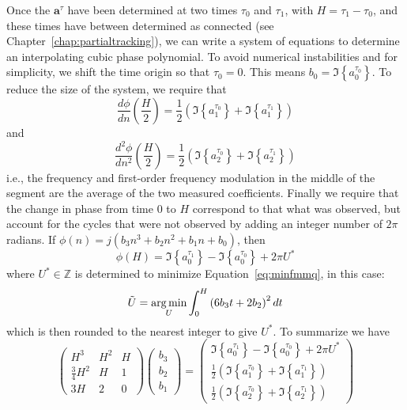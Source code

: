 Once the $\boldsymbol{a}^{\tau}$ have been determined
at two times $\tau_{0}$ and $\tau_{1}$, with $H = \tau_{1} - \tau_{0}$, and these
times have between determined as connected (see
Chapter~\ref{chap:partialtracking}), we can write a system of equations
to determine an interpolating cubic phase polynomial. To avoid numerical
instabilities and for simplicity, we shift the time origin so that $\tau_{0} =
0$. This means $b_0 = \Im \left\{ a^{\tau_0}_{0} \right\}$. To reduce the size
of the system, we require that 
\[
    \frac{d \phi}{d n} \left(\frac{H}{2} \right)
    =
    \frac{1}{2}
    \left( \Im \left\{ a^{\tau_0}_{1} \right\} + \Im \left\{ a^{\tau_1}_{1}
    \right\} \right)
\]
and
\[
    \frac{d^{2} \phi}{d n^{2}} \left(\frac{H}{2}
    \right)
    =
    \frac{1}{2} \left( \Im \left\{ a^{\tau_0}_{2} \right\} + \Im \left\{
    a^{\tau_1}_{2} \right\} \right)
\]
i.e., the frequency and first-order frequency modulation in the middle of the
segment are the average of the two measured coefficients. Finally we require
that the change in phase from time $0$ to $H$ correspond to that what was
observed, but account for the cycles that were not observed by adding an integer
number of $2\pi$ radians. If $\phi(n)=j(b_3 n^{3} + b_2 n^{2} + b_1 n + b_0)$,
then
\[
    \phi \left( H \right)
    =
    \Im \left\{ a^{\tau_1}_{0} \right\} - \Im \left\{ a^{\tau_0}_{0} \right\}
    + 2 \pi U^{\ast}
\]
where $U^{\ast} \in \mathbb{Z}$ is determined to minimize
Equation~\ref{eq:minfmmq}, in this case:
\begin{equation}
    \label{eq:minfmcubic}
    \tilde{U} = \mathop{\rm arg\,min}_{U} \int_{0}^{H} \left(
    6 b_3 t + 2 b_2 \right)^{2} dt
\end{equation}
which is then rounded to the nearest integer to give $U^{\ast}$. To summarize we have
\[
    \begin{pmatrix}
        H^{3} & H^{2} & H \\
        \frac{3}{4}H^{2} & H & 1 \\
        3 H & 2 & 0
    \end{pmatrix}
    \begin{pmatrix}
        b_{3} \\
        b_{2} \\
        b_{1}
    \end{pmatrix}
    =
    \begin{pmatrix}
        \Im \left\{ a^{\tau_1}_{0} \right\} - \Im \left\{ a^{\tau_0}_{0} \right\}
            + 2 \pi U^{\ast} \\
        \frac{1}{2}
        \left( \Im \left\{ a^{\tau_0}_{1} \right\} + \Im \left\{ a^{\tau_1}_{1}
        \right\} \right) \\
        \frac{1}{2} \left( \Im \left\{ a^{\tau_0}_{2} \right\} + \Im \left\{
        a^{\tau_1}_{2} \right\} \right)
    \end{pmatrix}
\]
